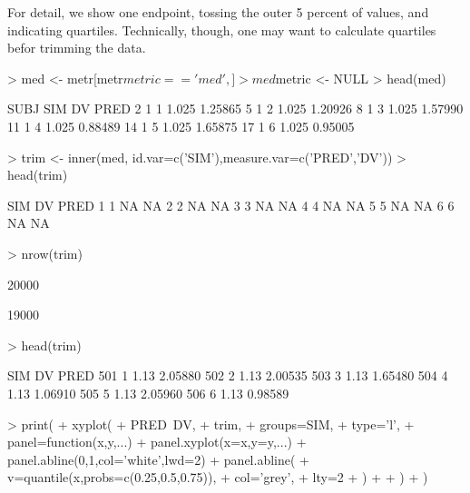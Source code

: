For detail, we show one endpoint, tossing the outer 5 percent of values, and 
indicating quartiles. Technically, though, one may want to calculate quartiles
befor trimming the data.
\begin{Schunk}
\begin{Sinput}
> med <- metr[metr$metric=='med',]
> med$metric <- NULL
> head(med)
\end{Sinput}
\begin{Soutput}
   SUBJ SIM    DV    PRED
2     1   1 1.025 1.25865
5     1   2 1.025 1.20926
8     1   3 1.025 1.57990
11    1   4 1.025 0.88489
14    1   5 1.025 1.65875
17    1   6 1.025 0.95005
\end{Soutput}
\begin{Sinput}
> trim <- inner(med, id.var=c('SIM'),measure.var=c('PRED','DV'))
> head(trim)
\end{Sinput}
\begin{Soutput}
  SIM DV PRED
1   1 NA   NA
2   2 NA   NA
3   3 NA   NA
4   4 NA   NA
5   5 NA   NA
6   6 NA   NA
\end{Soutput}
\begin{Sinput}
> nrow(trim)
\end{Sinput}
\begin{Soutput}
[1] 20000
\end{Soutput}
\begin{Soutput}
[1] 19000
\end{Soutput}
\begin{Sinput}
> head(trim)
\end{Sinput}
\begin{Soutput}
    SIM   DV    PRED
501   1 1.13 2.05880
502   2 1.13 2.00535
503   3 1.13 1.65480
504   4 1.13 1.06910
505   5 1.13 2.05960
506   6 1.13 0.98589
\end{Soutput}
\begin{Sinput}
> print(
+ 	xyplot(
+ 		PRED~DV,
+ 		trim,
+ 		groups=SIM,
+ 		type='l',
+ 		panel=function(x,y,...){
+ 			panel.xyplot(x=x,y=y,...)
+ 			panel.abline(0,1,col='white',lwd=2)
+ 			panel.abline(
+ 				v=quantile(x,probs=c(0.25,0.5,0.75)),
+ 				col='grey',
+ 				lty=2
+ 			)
+ 		}
+ 	)
+ )
\end{Sinput}
\end{Schunk}
